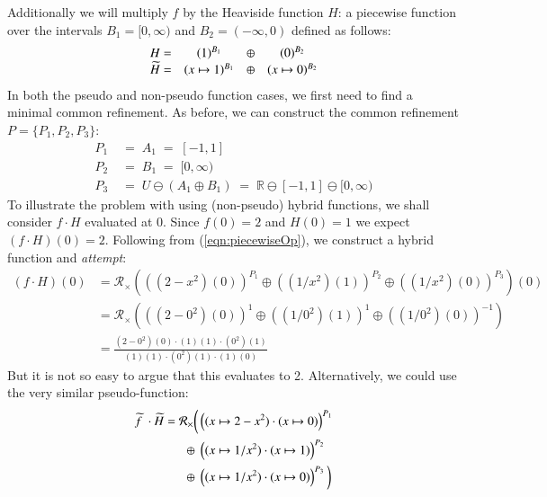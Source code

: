 Additionally we will multiply $f$ by the Heaviside function $H$: a piecewise function over the intervals
$B_1 = [0, \infty)$ and $B_2 = (-\infty, 0)$ defined as follows:
\begin{equation*}
	\begin{array}{r c c c}
		H			=& (1)^{B_1} 			&\oplus& 	(0)^{B_2} \\
		\,\pseudo{\!H} 	=& (x \mapsto 1)^{B_1}	&\oplus& 	(x \mapsto 0)^{B_2}
	\end{array}
\end{equation*}
In both the pseudo and non-pseudo function cases, we first need to find a minimal common refinement.
As before, we can construct the common refinement ${P = \{ P_1, P_2, P_3 \}}$:
\begin{align*}
	P_1 &\;=\; A_1 \;=\; [-1,1] \\
	P_2 &\;=\; B_1 \;=\;  [0, \infty) \\
	P_3 &\;=\; U \ominus (A_1 \oplus B_1) \;=\;  \mathbb{R} \ominus [-1,1] \ominus [0, \infty)
\end{align*}
To illustrate the problem with using (non-pseudo) hybrid functions, we shall consider $f\cdot H$ evaluated at 0. 
Since $f(0)=2$ and $H(0)=1$ we expect $(f\cdot H)(0)=2$.
Following from (\ref{eqn:piecewiseOp}), we construct a hybrid function and \emph{attempt}:
\begin{align*}
	(f \cdot H)(0) 
		&= \mathcal{R}_\times \left( 
			\left( (2-x^2)(0) \right)^{P_1} \oplus 
			\left( (1/x^2)(1) \right)^{P_2} \oplus 
			\left( (1/x^2)(0) \right)^{P_3} \right)(0) \\
		&= \mathcal{R}_\times \left( 
			\left( (2-0^2)(0) \right)^{1} \oplus 
			\left( (1/0^2)(1) \right)^{1} \oplus 
			\left( (1/0^2)(0) \right)^{-1} \right)\\
		& = \frac{(2-0^2)(0) \cdot (1)(1) \cdot (0^2)(1)}{(1)(1) \cdot (0^2)(1) \cdot (1)(0)}
\end{align*}
But it is not so easy to argue that this evaluates to 2.
Alternatively, we could use the very similar pseudo-function:
\begin{align*}
	\pseudo{f\;} \cdot \,\pseudo{\!H} = \mathcal{R}_\times \bigg(
				& \left( (x \mapsto 2-x^2) \cdot (x \mapsto 0) \right)^{P_1} \notag \\
		\oplus \;& \left( (x \mapsto 1/x^2) \cdot (x \mapsto 1) \right)^{P_2} \notag \\
		\oplus \;& \left( (x \mapsto 1/x^2) \cdot (x \mapsto 0) \right)^{P_3} 
	\bigg)
\end{align*}


